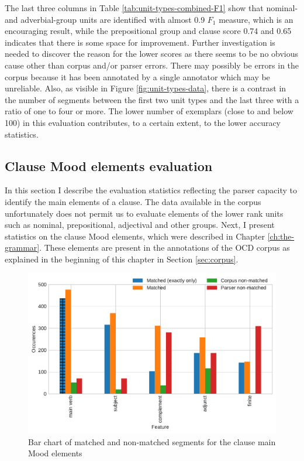     The last three columns in Table \ref{tab:unit-types-combined-F1} show that nominal- and adverbial-group units are identified with almost 0.9 $F_1$ measure, which is an encouraging result, while the prepositional group and clause score 0.74 and 0.65 indicates that there is some space for improvement. 
    Further investigation is needed to discover the reason for the lower scores as there seems to be no obvious cause other than corpus and/or parser errors. There may possibly be errors in the corpus because it has been annotated by a single annotator which may be unreliable. Also, as visible in Figure \ref{fig:unit-types-data}, there is a contrast in the number of segments between the first two unit types and the last three with a ratio of one to four or more. The lower number of exemplars (close to and below 100) in this evaluation contributes, to a certain extent, to the lower accuracy statistics.
    
\subsection{Clause Mood elements evaluation}
\label{sec:unit-mood-element-evaluation}

    In this section I describe the evaluation statistics reflecting the parser capacity to identify the main elements of a clause. The data available in the corpus unfortunately does not permit us to evaluate elements of the lower rank units such as nominal, prepositional, adjectival and other groups. Next, I present statistics on the clause Mood elements, which were described in Chapter \ref{ch:the-grammar}. These elements are present in the annotations of the OCD corpus as explained in the beginning of this chapter in Section \ref{sec:corpus}. 
    
    \begin{figure}[!ht]
    \centering
    \includegraphics[width=.85\textwidth]{evaluation-results/figures/unit-elements-mood-data.pdf}
    \caption{Bar chart of matched and non-matched segments for the clause main Mood elements}
    \label{fig:unit-elements-mood-data}
    \end{figure}
    
